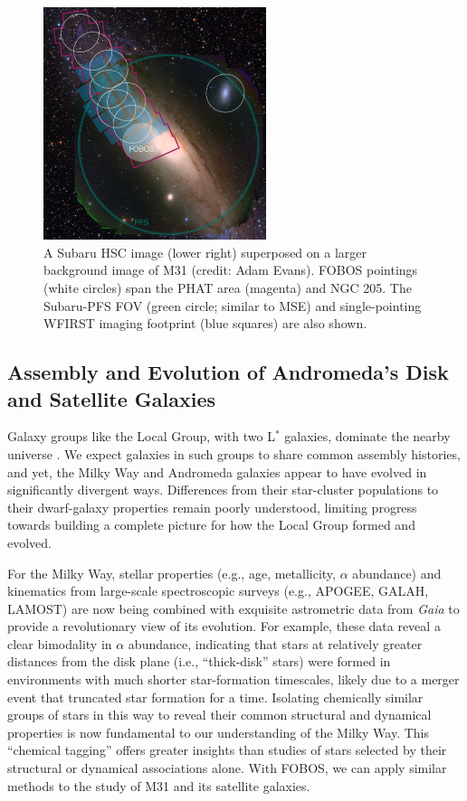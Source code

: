 \documentclass[11pt,a4paper,twoside,onecolumn,openany,final,oldfontcommands]{memoir}
\begin{document}
\begin{figure}
\includegraphics[width=0.58\textwidth]{figs/M31_footprint_v3.jpg}
\caption{A Subaru HSC image (lower right) superposed on a larger background image of M31 (credit: Adam Evans).  FOBOS pointings (white circles) span the PHAT area (magenta) and NGC 205.  The Subaru-PFS FOV (green circle; similar to MSE) and single-pointing WFIRST imaging footprint (blue squares) are also shown.}
\label{fig:M31}    
\end{figure}

\subsection{Assembly and Evolution of Andromeda's Disk and Satellite Galaxies}
\label{sec:localgroup}

Galaxy groups like the Local Group, with two L$^*$ galaxies, dominate the nearby universe \citep{kourkchi17}.  We expect galaxies in such groups to share common assembly histories, and yet, the Milky Way and Andromeda galaxies appear to have evolved in significantly divergent ways.  Differences from their star-cluster populations to their dwarf-galaxy properties remain poorly understood, limiting progress towards building a complete picture for how the Local Group formed and evolved.

For the Milky Way, stellar properties (e.g., age, metallicity, $\alpha$ abundance) and kinematics from large-scale spectroscopic surveys (e.g., APOGEE, GALAH, LAMOST) are now being combined with exquisite astrometric data from \textit{Gaia} to provide a revolutionary view of its evolution.  For example, these data reveal a clear bimodality in $\alpha$ abundance, indicating that stars at relatively greater distances from the disk plane (i.e., ``thick-disk'' stars) were formed in environments with much shorter star-formation timescales, likely due to a merger event that truncated star formation for a time.  Isolating chemically similar groups of stars in this way to reveal their common structural and dynamical properties is now fundamental to our understanding of the Milky Way.  This ``chemical tagging'' offers greater insights than studies of stars selected by their structural or dynamical associations alone.  With FOBOS, we can apply similar methods to the study of M31 and its satellite galaxies.
\end{document}

